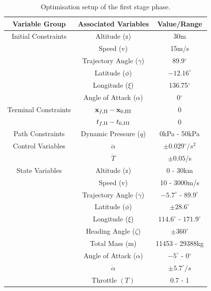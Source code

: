 \begin{table}[ht]
	\centering
	\begin{tabular}{|c|c|c|}
		\hline \textbf{Variable Group}  & \textbf{Associated Variables} & \textbf{Value/Range}\\
		\hline Initial Constraints   & Altitude (z)& 30m \\ & Speed (v) & 15m/s\\ & Trajectory Angle ($\gamma$) & 89.9$^\circ$\\ & Latitude ($\phi$)  & $-12.16^\circ$ \\& Longitude ($\xi$) & 136.75$^\circ$\\  & Angle of Attack ($\alpha$)& 0$^\circ$\\
		\hline Terminal Constraints & $\textbf{x}_{f,\textrm{\rom{2}}} - \textbf{x}_{0,\textrm{\rom{3}}}$ & 0\\ & $t_{f,\textrm{\rom{2}}} - t_{0,\textrm{\rom{3}}}$ & 0\\
		\hline Path Constraints & Dynamic Pressure ($q$) & 0kPa - 50kPa\\ 
		\hline Control Variables & $\ddot{\alpha}$ & $\pm0.029^\circ/s^2$\\ & $\dot{T}$ & $\pm0.05$/s\\ 
		\hline State Variables & Altitude (z) & 0 - 30km\\ & Speed (v) & 10 - 3000m/s\\ & Trajectory Angle ($\gamma$)& $-5.7^\circ$ - $89.9^\circ$ \\   & Latitude ($\phi$) & $\pm28.6^\circ$ \\  & Longitude ($\xi$)& $114.6^\circ$ - $171.9^\circ$\\   & Heading Angle ($\zeta$)& $\pm360^\circ$\\  & Total Mass (m)& 11453 - 29388kg \\  & Angle of Attack ($\alpha$)&  $-5^\circ$ - 0$^\circ$\\  & $\dot{\alpha}$& $\pm5.7^\circ/s$\\ & Throttle $(T)$ & 0.7 - 1\\ 
		\hline 
	\end{tabular} 
	
	\caption{Optimisation setup of the first stage phase. }
	\label{tab:1ststagesetup}
\end{table}


